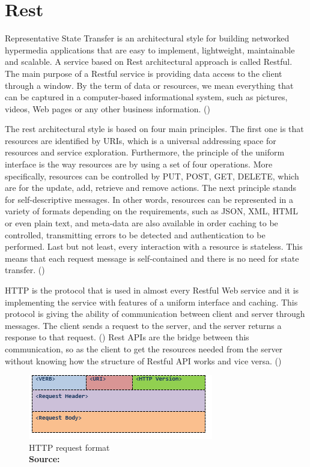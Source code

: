 \section{Rest}
Representative State Transfer is an architectural style for building networked hypermedia applications that are easy to implement, lightweight, maintainable and scalable. A service based on Rest architectural approach is called Restful. The main purpose of a Restful service is providing data access to the client through a window. By the term of data or resources, we mean everything that can be captured in a computer-based informational system, such as pictures, videos, Web pages or any other business information. (\cite{Reference7}) \par

The rest architectural style is based on four main principles. The first one is that resources are identified by URIs, which is a universal addressing space for resources and service exploration. Furthermore, the principle of the uniform interface is the way resources are by using a set of four operations. More specifically, resources can be controlled by PUT, POST, GET, DELETE, which are for the update, add, retrieve and remove actions. The next principle stands for self-descriptive messages. In other words, resources can be represented in a variety of formats depending on the requirements, such as JSON, XML, HTML or even plain text, and meta-data are also available in order caching to be controlled, transmitting errors to be detected and authentication to be performed. Last but not least, every interaction with a resource is stateless. This means that each request message is self-contained and there is no need for state transfer. (\cite{Reference8}) \par

HTTP is the protocol that is used in almost every Restful Web service and it is implementing the service with features of a uniform interface and caching. This protocol is giving the ability of communication between client and server through messages. The client sends a request to the server, and the server returns a response to that request. (\cite{Reference7}) Rest APIs are the bridge between this communication, so as the client to get the resources needed from the server without knowing how the structure of Restful API works and vice versa. (\cite{Reference9}) \par

\begin{figure}[h!]
	\begin{center}
		\includegraphics[scale=0.85]{images/httpFormat.png}
	\end{center}
	\caption{
		HTTP request format
		\\
		\textbf{Source:} \cite{Reference7}
	}
\end{figure}

